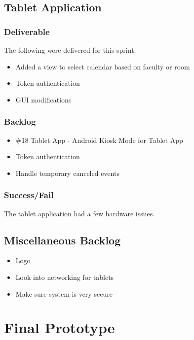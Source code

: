 \subsection{Tablet Application}
\subsubsection{Deliverable}
The following were delivered for this sprint:
\begin{itemize}
\item Added a view to select calendar based on faculty or room
\item Token authentication
\item GUI modifications
\end{itemize}
\subsubsection{Backlog}
\begin{itemize}
\item \#18 Tablet App - Android Kiosk Mode for Tablet App
\item Token authentication
\item Handle temporary canceled events
\end{itemize}

\subsubsection{Success/Fail}
The tablet application had a few hardware issues. 

\subsection*{Miscellaneous Backlog}
\begin{itemize}
\item Logo
\item Look into networking for tablets
\item Make sure system is very secure
\end{itemize}

\section{Final Prototype}

